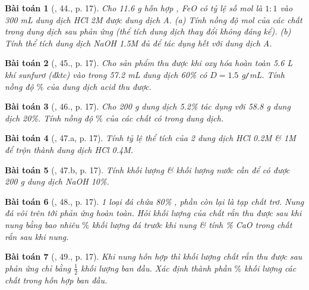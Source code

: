 \documentclass{article}
\newtheorem{baitoan}{Bài toán}
\begin{document}
\begin{baitoan}[\cite{An_400_BT_Hoa_Hoc_9}, 44., p. 17]
	Cho {\rm11.6 g} hỗn hợp {\rm{}, FeO} có tỷ lệ số mol là $1:1$ vào {\rm300 mL} dung dịch {\rm HCl 2M} được dung dịch A. (a) Tính nồng độ mol của các chất trong dung dịch sau phản ứng (thể tích dung dịch thay đổi không đáng kể). (b) Tính thể tích dung dịch {\rm NaOH 1.5M} đủ để tác dụng hết với dung dịch A.
\end{baitoan}

\begin{baitoan}[\cite{An_400_BT_Hoa_Hoc_9}, 45., p. 17]
	Cho sản phẩm thu được khi oxy hóa hoàn toàn {\rm5.6 L} khí sunfurơ (đktc) vào trong {\rm57.2 mL} dung dịch {\rm{} 60\%} có $D = 1.5$ {\rm g{\tt/}mL}. Tính nồng độ $\%$ của dung dịch acid thu được.
\end{baitoan}

\begin{baitoan}[\cite{An_400_BT_Hoa_Hoc_9}, 46., p. 17]
	Cho {\rm200 g} dung dịch {\rm{} 5.2\%} tác dụng với {\rm58.8 g} dung dịch {\rm{} 20\%}. Tính nồng độ $\%$ của các chất có trong dung dịch.
\end{baitoan}

\begin{baitoan}[\cite{An_400_BT_Hoa_Hoc_9}, 47.a, p. 17]
	Tính tỷ lệ thể tích của 2 dung dịch {\rm HCl 0.2M \& 1M} để trộn thành dung dịch {\rm HCl 0.4M}.
\end{baitoan}

\begin{baitoan}[\cite{An_400_BT_Hoa_Hoc_9}, 47.b, p. 17]
	Tính khối lượng {\rm{}} \& khối lượng nước cần để có được {\rm200 g} dung dịch {\rm NaOH 10\%}.
\end{baitoan}

\begin{baitoan}[\cite{An_400_BT_Hoa_Hoc_9}, 48., p. 17]
	1 loại đá chứa {\rm80\% }, phần còn lại là tạp chất trơ. Nung đá vôi trên tới phản ứng hoàn toàn. Hỏi khối lượng của chất rắn thu được sau khi nung bằng bao nhiêu $\%$ khối lượng đá trước khi nung \& tính {\rm\% CaO} trong chất rắn sau khi nung.
\end{baitoan}

\begin{baitoan}[\cite{An_400_BT_Hoa_Hoc_9}, 49., p. 17]
	Khi nung hỗn hợp {\rm{}} thì khối lượng chất rắn thu được sau phản ứng chỉ bằng $\frac{1}{2}$ khối lượng ban đầu. Xác định thành phần $\%$ khối lượng các chất trong hỗn hợp ban đầu.
\end{baitoan}
\end{document}
